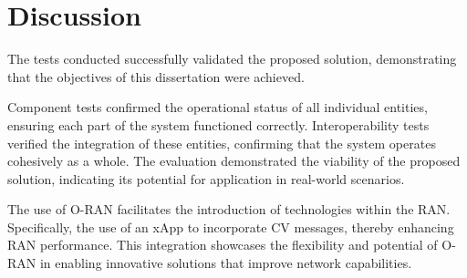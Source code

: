 


\section{Discussion}\label{sec:discuss}
The tests conducted successfully validated the proposed solution, demonstrating that the objectives of this dissertation were achieved.

Component tests confirmed the operational status of all individual entities, ensuring each part of the system functioned correctly.
Interoperability tests verified the integration of these entities, confirming that the system operates cohesively as a whole.
The evaluation demonstrated the viability of the proposed solution, indicating its potential for application in real-world scenarios.

The use of O-RAN facilitates the introduction of technologies within the RAN\@.
Specifically, the use of an xApp to incorporate CV messages, thereby enhancing RAN performance.
This integration showcases the flexibility and potential of O-RAN in enabling innovative solutions that improve network capabilities.
